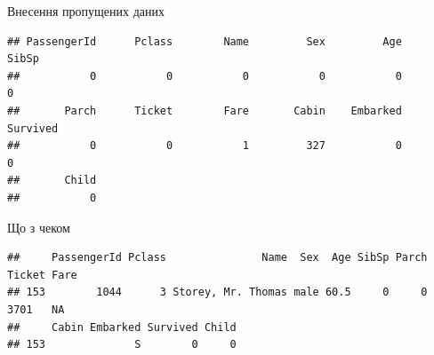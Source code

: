 \documentclass[ignorenonframetext,]{beamer}
\newenvironment{Shaded}{\begin{snugshade}}{\end{snugshade}}
\newcommand{\DataTypeTok}[1]{\textcolor[rgb]{0.13,0.29,0.53}{#1}}
\newcommand{\DecValTok}[1]{\textcolor[rgb]{0.00,0.00,0.81}{#1}}
\newcommand{\KeywordTok}[1]{\textcolor[rgb]{0.13,0.29,0.53}{\textbf{#1}}}
\newcommand{\NormalTok}[1]{#1}
\newcommand{\OperatorTok}[1]{\textcolor[rgb]{0.81,0.36,0.00}{\textbf{#1}}}
\newcommand{\OtherTok}[1]{\textcolor[rgb]{0.56,0.35,0.01}{#1}}
\newcommand{\StringTok}[1]{\textcolor[rgb]{0.31,0.60,0.02}{#1}}
\begin{document}
\begin{frame}[fragile]{Внесення пропущених даних}
\protect\hypertarget{ux432ux43dux435ux441ux435ux43dux43dux44f-ux43fux440ux43eux43fux443ux449ux435ux43dux438ux445-ux434ux430ux43dux438ux445}{}

\begin{Shaded}
\end{Shaded}

\begin{verbatim}
## PassengerId      Pclass        Name         Sex         Age       SibSp 
##           0           0           0           0           0           0 
##       Parch      Ticket        Fare       Cabin    Embarked    Survived 
##           0           0           1         327           0           0 
##       Child 
##           0
\end{verbatim}

\end{frame}

\begin{frame}[fragile]{Що з чеком}
\protect\hypertarget{ux449ux43e-ux437-ux447ux435ux43aux43eux43c}{}

\begin{Shaded}
\end{Shaded}

\begin{verbatim}
##     PassengerId Pclass               Name  Sex  Age SibSp Parch Ticket Fare
## 153        1044      3 Storey, Mr. Thomas male 60.5     0     0   3701   NA
##     Cabin Embarked Survived Child
## 153              S        0     0
\end{verbatim}

\begin{Shaded}
\end{Shaded}

\end{frame}
\end{document}
